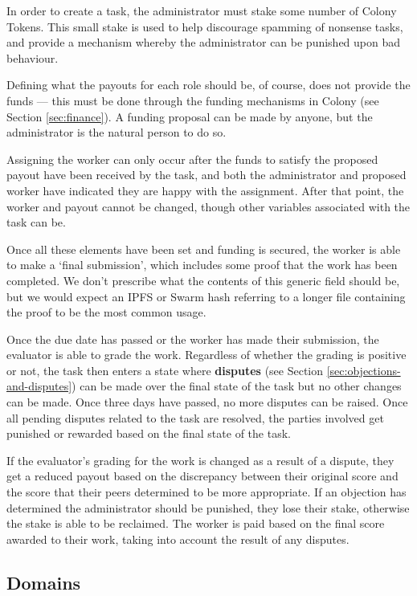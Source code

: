 In order to create a task, the administrator must stake some number of Colony Tokens. This small stake is used to help discourage spamming of nonsense tasks, and provide a mechanism whereby the administrator can be punished upon bad behaviour. 

Defining what the payouts for each role should be, of course, does not provide the funds --- this must be done through the funding mechanisms in Colony (see Section \ref{sec:finance}). A funding proposal can be made by anyone, but the administrator is the natural person to do so.

Assigning the worker can only occur after the funds to satisfy the proposed payout have been received by the task, and both the administrator and proposed worker have indicated they are happy with the assignment. After that point, the worker and payout cannot be changed, though other variables associated with the task can be.

Once all these elements have been set and funding is secured, the worker is able to make a `final submission', which includes some proof that the work has been completed. We don't prescribe what the contents of this generic field should be, but we would expect an IPFS or Swarm hash referring to a longer file containing the proof to be the most common usage.

Once the due date has passed or the worker has made their submission, the evaluator is able to grade the work. Regardless of whether the grading is positive or not, the task then enters a state where \textbf{disputes} (see Section \ref{sec:objections-and-disputes}) can be made over the final state of the task but no other changes can be made. Once three days have passed, no more disputes can be raised. Once all pending disputes related to the task are resolved, the parties involved get punished or rewarded based on the final state of the task.

If the evaluator's grading for the work is changed as a result of a dispute, they get a reduced payout based on the discrepancy between their original score and the score that their peers determined to be more appropriate. If an objection has determined the administrator should be punished, they lose their stake, otherwise the stake is able to be reclaimed. The worker is paid based on the final score awarded to their work, taking into account the result of any disputes.

\subsection{Domains}\label{sec:domains}

